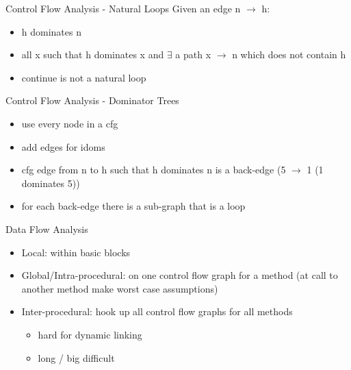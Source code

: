 \documentclass[mcgill,slideColor,colorBG,pdf]{prosper}
\begin{document}
\begin{slide} {Control Flow Analysis - Natural Loops}
Given an edge n $\rightarrow$ h:
\begin{itemize}
\item h dominates n
\item all x such that h dominates x and $\exists$ a path x $\rightarrow$ n which does not contain h
\begin{center}
\end{center}
\item continue is not a natural loop
\end{itemize}
\end{slide}

\begin{slide} {Control Flow Analysis - Dominator Trees}
\begin{itemize}
\item use every node in a cfg
\item add edges for idoms
\begin{center}
\end{center}
\item cfg edge from n to h such that h dominates n is a back-edge (5 $\rightarrow$ 1 (1 dominates 5))
\item for each back-edge there is a sub-graph that is a loop
\end{itemize}
\end{slide}


\begin{slide} {Data Flow Analysis}
\begin{itemize}
\item Local: within basic blocks
\item Global/Intra-procedural: on one control flow graph for a method (at call to another method make worst case assumptions)
\item Inter-procedural: hook up all control flow graphs for all methods 
\begin{itemize}
\item hard for dynamic linking
\item long / big difficult
\end{itemize}
\end{itemize}
\end{slide}
\end{document}
